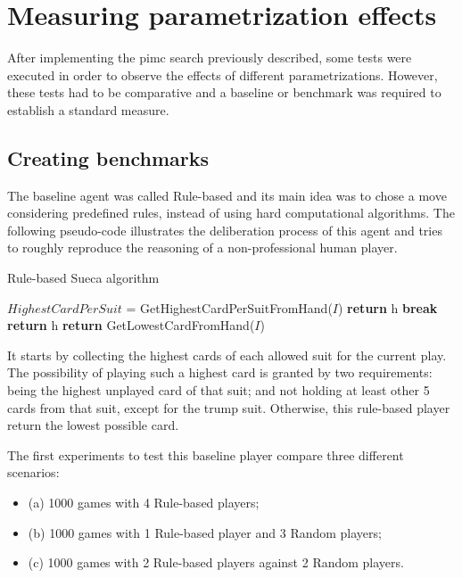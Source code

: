 \section{Measuring parametrization effects}
\label{sec:parametrizing}

After implementing the \ac{pimc} search previously described, some tests were executed in order to observe the effects of different parametrizations.
However, these tests had to be comparative and a baseline or benchmark was required to establish a standard measure.


\subsection{Creating benchmarks}
The baseline agent was called Rule-based and its main idea was to chose a move considering predefined rules, instead of using hard computational algorithms.
The following pseudo-code illustrates the deliberation process of this agent and tries to roughly reproduce the reasoning of a non-professional human player.

\begin{algorithm}
	\caption{Rule-based Sueca algorithm}
	\begin{algorithmic}[1]
			\State $HighestCardPerSuit$ = GetHighestCardPerSuitFromHand($I$)
						\State \textbf{return} h
						\State \textbf{break}
						\State \textbf{return} h
					\EndIf
				\EndIf
			\EndFor
			\State \textbf{return} GetLowestCardFromHand($I$)
		\EndProcedure
	\end{algorithmic}
	\label{alg:pimc}
\end{algorithm}

It starts by collecting the highest cards of each allowed suit for the current play.
The possibility of playing such a highest card is granted by two requirements: being the highest unplayed card of that suit; and not holding at least other 5 cards from that suit, except for the trump suit.
Otherwise, this rule-based player return the lowest possible card.

The first experiments to test this baseline player compare three different scenarios:
\begin{itemize}
\item (a) 1000 games with 4 Rule-based players;
\item (b) 1000 games with 1 Rule-based player and 3 Random players;
\item (c) 1000 games with 2 Rule-based players against 2 Random players.
\end{itemize}

